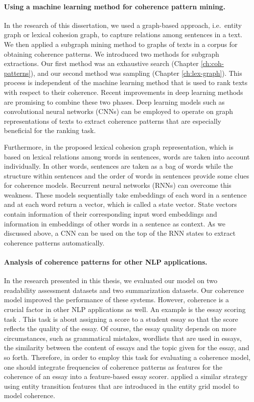 \paragraph{Using a machine learning method for coherence pattern mining.} 
In the research of this dissertation, we used a graph-based approach, i.e.\ entity graph or lexical cohesion graph, to capture relations among sentences in a text. 
We then applied a subgraph mining method to graphs of texts in a corpus for obtaining coherence patterns. 
We introduced two methods for subgraph extractions.  
Our first method was an exhaustive search (Chapter \ref{ch:coh-patterns}), and our second method was sampling (Chapter \ref{ch:lex-graph}). 
This process is independent of the machine learning method that is used to rank texts with respect to their coherence. 
Recent improvements in deep learning methods are promising to combine these two phases. 
Deep learning models such as convolutional neural networks (CNNs) \cite{kimyoon14} can be employed to operate on graph representations of texts to extract coherence patterns that are especially beneficial for the ranking task. 

Furthermore, in the proposed lexical cohesion graph representation, which is based on lexical relations among words in sentences, words are taken into account individually. 
In other words, sentences are taken as a bag of words while the structure within sentences \cite{louis12} and the order of words in sentences provide some clues for coherence models. 
Recurrent neural networks (RNNs) can overcome this weakness. 
These models sequentially take embeddings of each word in a sentence and at each word return a vector, which is called a state vector.  
State vectors contain information of their corresponding input word embeddings and information in embeddings of other words in a sentence as context.  
As we discussed above, a CNN can be used on the top of the RNN states to extract coherence patterns automatically. 

\paragraph{Analysis of coherence patterns for other NLP applications.}
In the research presented in this thesis, we evaluated our model on two readability assessment datasets and two summarization datasets. 
Our coherence model improved the performance of these systems. 
However, coherence is a crucial factor in other NLP applications as well. 
An example is the essay scoring task \cite{dikli06,higgins04,miltsakaki04a,}.  
This task is about assigning a score to a student essay so that the score reflects the quality of the essay. 
Of course, the essay quality depends on more circumstances, such as grammatical mistakes, wordlists that are used in essays, the similarity between the content of essays and the topic given for the essay, and so forth. 
Therefore, in order to employ this task for evaluating a coherence model,  one should integrate frequencies of coherence patterns as features for the coherence of an essay into a feature-based essay scorer. 
 applied a similar strategy using entity transition features that are introduced in the entity grid model \cite{barzilay05a} to model coherence.  

